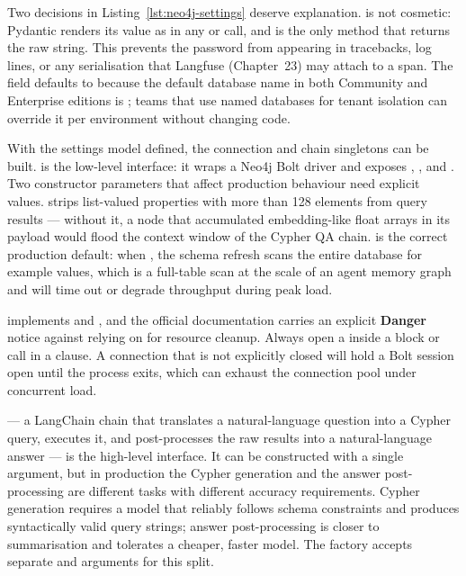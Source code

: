 Two decisions in Listing~\ref{lst:neo4j-settings} deserve explanation.
 is not cosmetic: Pydantic renders its value as
\code{**********} in any  or  call, and
 is the only method that returns the raw string.
This prevents the password from appearing in tracebacks, log lines, or any
serialisation that Langfuse (Chapter~23) may attach to a span.
The  field defaults to  because the
default database name in both Community and Enterprise editions is
; teams that use named databases for tenant isolation can
override it per environment without changing code.

With the settings model defined, the connection and chain singletons can
be built.  is the low-level interface: it wraps a Neo4j
Bolt driver and exposes , , and
. Two constructor parameters that affect
production behaviour need explicit values.  strips
list-valued properties with more than 128 elements from query results ---
without it, a node that accumulated embedding-like float arrays in its
payload would flood the context window of the Cypher QA chain.
 is the correct production default: when
, the schema refresh scans the entire database for example
values, which is a full-table scan at the scale of an agent memory graph
and will time out or degrade throughput during peak load.

\begin{warningbox}
 implements  and ,
and the official documentation carries an explicit \textbf{Danger} notice
against relying on  for resource cleanup. Always open a
 inside a  block or call 
in a  clause. A connection that is not explicitly closed will
hold a Bolt session open until the process exits, which can exhaust the
connection pool under concurrent load.
\end{warningbox}

 --- a LangChain chain that translates a
natural-language question into a Cypher query, executes it, and
post-processes the raw results into a natural-language answer --- is the
high-level interface. It can be constructed with a single 
argument, but in production the Cypher generation and the answer
post-processing are different tasks with different accuracy requirements.
Cypher generation requires a model that reliably follows schema constraints
and produces syntactically valid query strings; answer post-processing is
closer to summarisation and tolerates a cheaper, faster model. The
 factory accepts separate  and
 arguments for this split.

